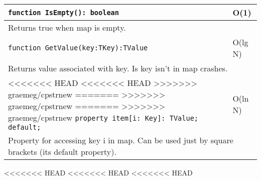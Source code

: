 \begin{longtable}{|m{10cm}|m{5cm}|}
\verb!function IsEmpty(): boolean! & O(1) \\ \hline
\multicolumn{2}{|m{15cm}|}{Returns true when map is empty.} \\\hline

\verb!function GetValue(key:TKey):TValue! & O(lg N) \\\hline
\multicolumn{2}{|m{15cm}|}{Returns value associated with key. Is key isn't in map crashes.} \\\hline

<<<<<<< HEAD
<<<<<<< HEAD
>>>>>>> graemeg/cpstrnew
=======
>>>>>>> graemeg/cpstrnew
=======
>>>>>>> graemeg/cpstrnew
\verb!property item[i: Key]: TValue; default;! & O(ln N) \\\hline
\multicolumn{2}{|m{15cm}|}{Property for accessing key i in map. Can be used just by square
brackets (its default property).} \\\hline\hline


\end{longtable}
<<<<<<< HEAD
<<<<<<< HEAD
<<<<<<< HEAD

